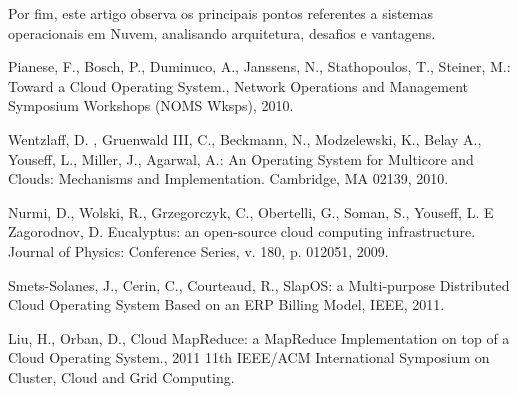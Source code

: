 \documentclass{llncs}
\begin{document}
Por fim, este artigo observa os principais pontos referentes a sistemas operacionais em Nuvem, analisando arquitetura, desafios e vantagens.

\begin{thebibliography}{5}
%
Pianese, F., Bosch, P., Duminuco, A., Janssens, N., Stathopoulos, T., Steiner, M.:
Toward a Cloud Operating System., 
Network Operations and Management Symposium Workshops (NOMS Wksps), 2010.

Wentzlaff, D. , Gruenwald III, C., Beckmann, N., Modzelewski, K., Belay A., Youseff, L., Miller, J., Agarwal, A.:
An Operating System for Multicore and Clouds: Mechanisms and Implementation. Cambridge, MA 02139, 2010.

Nurmi, D., Wolski, R., Grzegorczyk, C., Obertelli, G., Soman, S., Youseff, L. E Zagorodnov, D.
Eucalyptus: an open-source cloud computing infrastructure. 
Journal of Physics: Conference Series, v. 180, p. 012051, 2009.

Smets-Solanes, J., Cerin, C., Courteaud, R., 
SlapOS: a Multi-purpose Distributed Cloud Operating System Based on an ERP Billing Model, 
IEEE, 2011.

Liu, H., Orban, D.,
Cloud MapReduce: a MapReduce Implementation on top of a Cloud Operating System.,
2011 11th IEEE/ACM International Symposium on Cluster, Cloud and Grid Computing.









\end{thebibliography}
\end{document}
